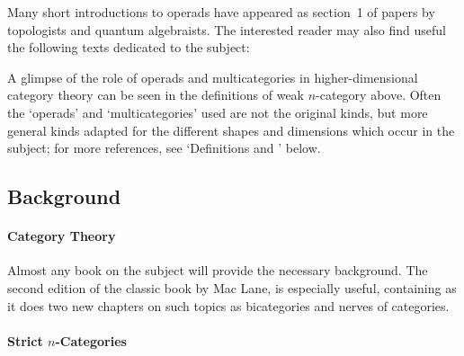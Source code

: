 Many short introductions to operads have appeared as section~1 of papers by
topologists and quantum algebraists.  The interested reader may also find
useful the following texts dedicated to the subject:
% 
%
% 
% 
%
% 
% 
%
%

A glimpse of the role of operads and multicategories in higher-dimensional
category theory can be seen in the definitions of weak $n$-category above.
Often the `operads' and `multicategories' used are not the original kinds,
but more general kinds adapted for the different shapes and dimensions which
occur in the subject; for more references, see `Definitions  and
' below. 



\subsection*{Background}

\paragraph*{Category Theory}

Almost any book on the subject will provide the necessary %
background.  The second edition of the classic book by Mac Lane,
% 
%
% 
is especially useful, containing as it does two new chapters on such
topics as bicategories and nerves of categories.  

\paragraph*{Strict $n$-Categories}


